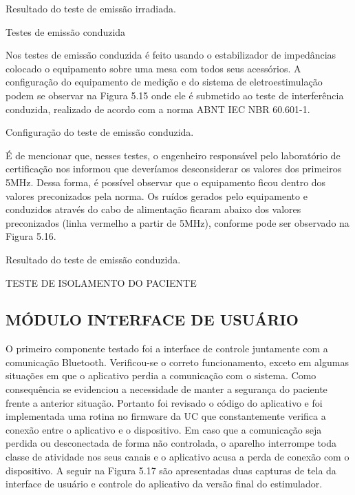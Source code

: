          Resultado  do  teste  de  emissão  irradiada.  
         
         Testes  de  emissão  conduzida 
         
         Nos  testes  de  emissão  conduzida  é  feito  usando  o  estabilizador  de  impedâncias  colocado  o  equipamento  sobre  uma  mesa  com  todos  seus  acessórios.  A  configuração  do  equipamento  de  medição  e  do  sistema  de  eletroestimulação  podem  se  observar  na  Figura  5.15  onde  ele  é  submetido  ao  teste  de  interferência  conduzida,  realizado  de  acordo  com  a  norma  ABNT  IEC  NBR  60.601-1. 
         
         
         Configuração  do  teste  de  emissão  conduzida.
         
         É  de  mencionar  que,  nesses  testes,  o  engenheiro  responsável  pelo  laboratório  de  certificação  nos  informou  que  deveríamos  desconsiderar  os  valores  dos  primeiros  5MHz.  Dessa  forma,  é  possível observar  que  o  equipamento  ficou  dentro  dos  valores  preconizados  pela  norma.  Os  ruídos  gerados  pelo  equipamento  e  conduzidos  através  do  cabo  de  alimentação  ficaram  abaixo  dos  valores  preconizados  (linha  vermelho  a  partir  de  5MHz),  conforme  pode  ser  observado  na  Figura  5.16.
         
         Resultado  do  teste  de  emissão  conduzida.
         
         TESTE  DE  ISOLAMENTO  DO  PACIENTE 
         
         \subsection{MÓDULO  INTERFACE  DE  USUÁRIO}
         
         O  primeiro  componente  testado  foi  a  interface  de  controle  juntamente  com  a  comunicação  Bluetooth.  Verificou-se  o  correto  funcionamento,  exceto  em  algumas  situações  em  que  o  aplicativo  perdia  a  comunicação  com  o  sistema.  Como  consequência  se  evidenciou  a  necessidade  de  manter  a  segurança  do  paciente  frente  a  anterior  situação.  Portanto  foi  revisado  o  código  do  aplicativo  e  foi  implementada  uma  rotina  no  firmware  da  UC  que  constantemente  verifica  a  conexão  entre  o  aplicativo  e  o  dispositivo.  Em  caso  que  a  comunicação  seja  perdida  ou  desconectada  de  forma  não  controlada,  o  aparelho  interrompe  toda  classe  de  atividade  nos  seus  canais  e  o  aplicativo  acusa  a  perda  de  conexão  com  o  dispositivo.  A  seguir  na  Figura  5.17  são  apresentadas  duas  capturas  de  tela  da  interface  de  usuário  e  controle  do  aplicativo  da  versão  final  do  estimulador. 
       
